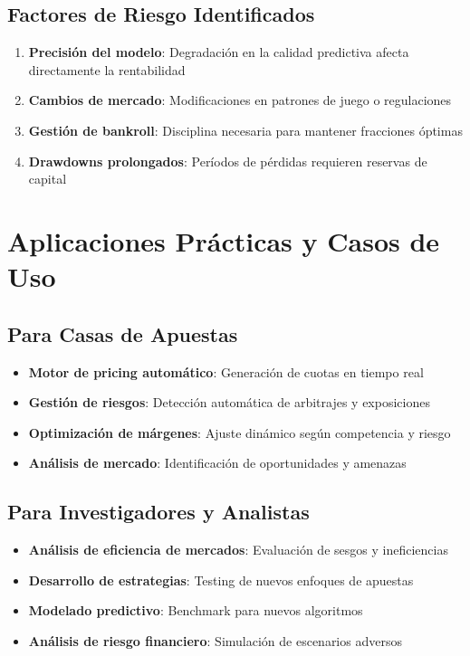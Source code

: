 \documentclass{article}
\begin{document}
\subsection{Factores de Riesgo Identificados}

\begin{enumerate}
    \item \textbf{Precisión del modelo}: Degradación en la calidad predictiva afecta directamente la rentabilidad
    \item \textbf{Cambios de mercado}: Modificaciones en patrones de juego o regulaciones
    \item \textbf{Gestión de bankroll}: Disciplina necesaria para mantener fracciones óptimas
    \item \textbf{Drawdowns prolongados}: Períodos de pérdidas requieren reservas de capital
\end{enumerate}

\section{Aplicaciones Prácticas y Casos de Uso}

\subsection{Para Casas de Apuestas}

\begin{itemize}
    \item \textbf{Motor de pricing automático}: Generación de cuotas en tiempo real
    \item \textbf{Gestión de riesgos}: Detección automática de arbitrajes y exposiciones
    \item \textbf{Optimización de márgenes}: Ajuste dinámico según competencia y riesgo
    \item \textbf{Análisis de mercado}: Identificación de oportunidades y amenazas
\end{itemize}

\subsection{Para Investigadores y Analistas}

\begin{itemize}
    \item \textbf{Análisis de eficiencia de mercados}: Evaluación de sesgos y ineficiencias
    \item \textbf{Desarrollo de estrategias}: Testing de nuevos enfoques de apuestas
    \item \textbf{Modelado predictivo}: Benchmark para nuevos algoritmos
    \item \textbf{Análisis de riesgo financiero}: Simulación de escenarios adversos
\end{itemize}
\end{document}
